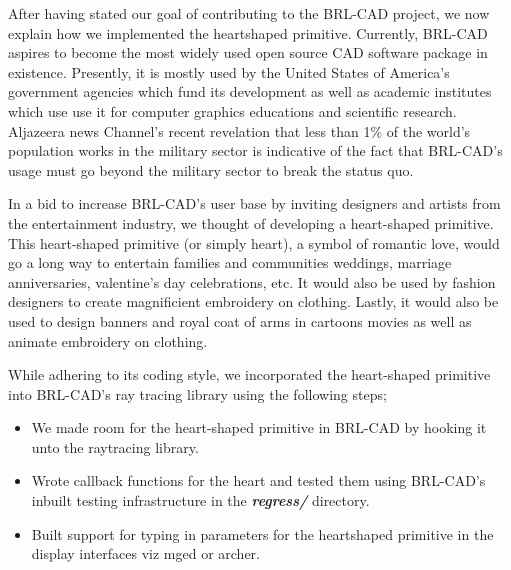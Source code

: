 \hspace{30} After   having   stated   our   goal   of   contributing   to   the   BRL-­CAD   project,   we  
now   explain   how   we   implemented   the   heart­shaped   primitive.   Currently,  
BRL­-CAD   aspires   to   become   the   most   widely   used   open   source  
CAD   software   package   in   existence.   Presently,   it   is   mostly  
used   by   the   United   States   of   America's   government   agencies   which   fund   its  
development   as   well   as   academic   institutes   which   use   use   it   for   computer  
graphics   educations   and   scientific   research.   Aljazeera   news   Channel's   recent  
revelation   that   less   than   1\%   of   the   world's   population   works   in   the   military   sector  
is   indicative   of   the   fact   that   BRL-­CAD's   usage   must   go   beyond   the   military  
sector to break the status­ quo.   

\hspace{30} In   a   bid   to   increase   BRL-­CAD's   user   base   by   inviting   designers   and  
artists   from   the   entertainment   industry,   we   thought   of   developing   a  
heart-­shaped   primitive.   This   heart­-shaped   primitive   (or   simply   heart),   a   symbol  
of   romantic   love,   would   go   a   long   way   to   entertain   families   and   communities  
weddings,   marriage   anniversaries,   valentine's   day   celebrations,   etc.   It   would  
also   be   used   by   fashion   designers   to   create   magnificient   embroidery   on  
clothing.   Lastly,   it   would   also   be   used   to   design   banners   and   royal   coat   of   arms  
in cartoons movies as well as animate embroidery on clothing.   

\hspace{30} While   adhering   to   its   coding   style,   we   incorporated   the   heart-­shaped  
primitive into BRL­-CAD's ray tracing library using the following steps;  

\begin{itemize}
\item We made room for the heart-shaped primitive in BRL­-CAD by hooking it unto the raytracing library.  
\item Wrote callback   functions   for   the   heart   and   tested   them   using   BRL-­CAD's  
inbuilt testing infrastructure in the \textit{\textbf{regress/}} directory.  
\item Built   support   for   typing   in   parameters   for   the   heart­shaped   primitive   in   the  
display interfaces viz mged or archer.
\end{itemize}

